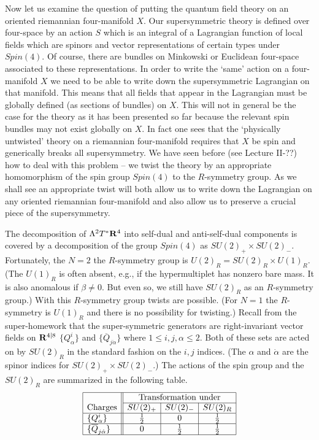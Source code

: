 \documentclass[10pt]{article}
\begin{document}
Now let us examine the question of putting the quantum field theory on
an oriented riemannian four-manifold $X$. Our supersymmetric
theory is defined over four-space by an action $S$ which is an
integral of a Lagrangian function of local fields which are spinors
and vector representations of certain types under $Spin(4)$. Of
course, there are bundles on Minkowski or Euclidean four-space
associated to these representations.
In order to write the `same' action on a  four-manifold $X$
we need to be able to write down the supersymmetric Lagrangian on that
manifold. 
This means that all fields that appear in the Lagrangian
 must be globally defined (as sections of bundles) on $X$.  
This will not in general be the case for the theory as it has been
presented so far because the relevant spin bundles may not exist
globally on $X$.
In fact one sees that the `physically untwisted' theory on a riemannian
four-manifold requires that $X$ be spin and generically breaks all
supersymmetry. 
We have seen before (see Lecture II-??) how to deal
with this problem -- we twist the theory by an appropriate
homomorphism of the spin group $Spin(4)$ to the $R$-symmetry group. 
As we shall see an appropriate twist will both allow us to write down
the Lagrangian on any oriented riemannian four-manifold and also
allow us  to preserve a crucial piece of the supersymmetry.



The decomposition of $\Lambda^2T^*{\bf R}^4$
into self-dual and anti-self-dual components is covered by a decomposition
of the group $Spin(4)$ as $SU(2)_+\times SU(2)_-$.
Fortunately, the $N=2$ the $R$-symmetry group is $U(2)_R=SU(2)_R\times
U(1)_R$.  (The $U(1)_R$ is often absent, e.g., if the hypermultiplet
has nonzero bare  mass. It is also anomalous if $\beta\not= 0$. But
even so, we still have $SU(2)_R$ as an 
$R$-symmetry group.) With this $R$-symmetry group twists  are possible. 
(For $N=1$ the
$R$-symmetry is $U(1)_R$ and there is no possibility for twisting.) 
Recall from the super-homework that the super-symmetric generators are
right-invariant vector fields on ${\bf R}^{4|8}$
$\{Q^i_\alpha\}$ and $\{\overline{Q}_{j\dot\alpha}\}$ where
$1\le i,j,\alpha\le 2$. Both of these sets are acted on
by  $SU(2)_R$ in the standard fashion on the $i,j$ indices.
(The $\alpha$ and $\dot\alpha$ are the spinor indices for
$SU(2)_+\times SU(2)_-$.)  
The actions of the spin group and the $SU(2)_R$ are summarized in the
following table.
$$\begin{array}{|l||c|c|c|}
\hline 
 & \multicolumn{3}{c|} {\rm Transformation\ under} \\
\cline{2-4}
{\rm Charges} &  SU(2)_+ & SU(2)_- & SU(2)_R \\
\hline
 \{Q^i_\alpha\} & \frac{1}{2} & 0 & \frac{1}{2} \\
\hline
\{\overline{Q}_{j\dot\alpha}\} & 0 & \frac{1}{2} &\frac{1}{2} \\
\hline
\end{array}
$$
\end{document}
